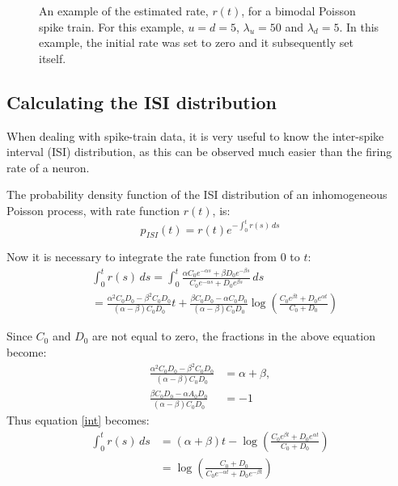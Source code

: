 \begin{figure}

\caption{An example of the estimated rate, $r(t)$, for a bimodal Poisson spike train.  For this example, $u=d=5$, $\lambda_u=50$ and $\lambda_d=5$.  In this example, the initial rate was set to zero and it subsequently set itself.}
\end{figure}

\subsection{Calculating the ISI distribution}

When dealing with spike-train data, it is very useful to know the inter-spike interval (ISI) distribution, as this can be observed much easier than the firing rate of a neuron.

The probability density function of the ISI distribution of an inhomogeneous Poisson process, with rate function $r(t)$, is:
\begin{equation}
p_{ISI}(t) = r(t) e^{-\int_0^t r(s)\,ds}
\end{equation}

Now it is necessary to integrate the rate function from $0$ to $t$:
\begin{equation}
\begin{split}
\label{int}
&\int_0^t r(s)\,ds = \int_0^t  \frac{\alpha C_0e^{-\alpha s}+\beta D_0e^{-\beta s}}{C_0e^{-\alpha s} + D_0e^{\beta s}}\,ds\\ 
&= \frac{\alpha^2 C_0D_0 - \beta^2 C_0D_0}{(\alpha - \beta)C_0D_0}t + \frac{\beta C_0D_0-\alpha C_0D_0}{(\alpha - \beta)C_0D_0} \log\left({\frac{C_0e^{\beta t} + D_0e^{\alpha t}}{C_0 + D_0} }\right)
\end{split}
\end{equation}

Since $C_0$ and $D_0$ are not equal to zero, the fractions in the above equation become:
\begin{equation}
\begin{split}
\frac{\alpha^2 C_0D_0 - \beta^2 C_0D_0}{(\alpha - \beta)C_0D_0} & = \alpha+\beta,\\
 \frac{ \beta C_0D_0-\alpha A_0D_0}{(\alpha - \beta)C_0D_0} &= -1
\end{split}
\end{equation}
Thus equation \ref{int} becomes:
\begin{equation}
\begin{split}
\int_0^t r(s)\,ds &= (\alpha+\beta)t - \log\left( {\frac{C_0e^{\beta t} + D_0e^{\alpha t}}{C_0 + D_0} }\right) \\
&= \log \left( \frac{C_0+D_0}{C_0e^{-\alpha t}+D_0e^{-\beta t}}\right)
\end{split}
\end{equation}

